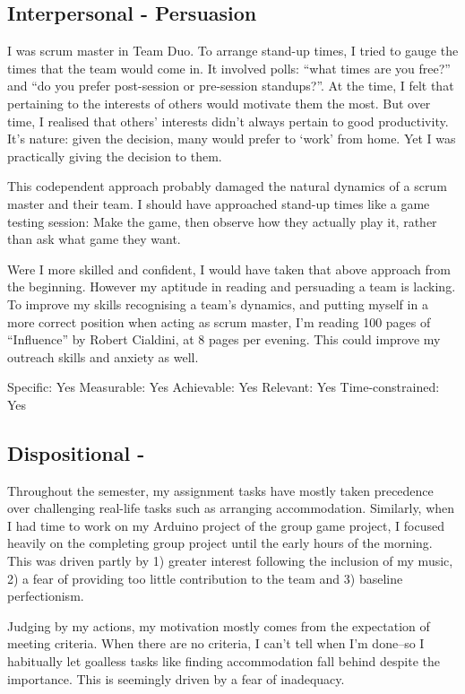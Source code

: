 \documentclass{scrartcl}
\begin{document}
\subsection{Interpersonal - Persuasion} %
I was scrum master in Team Duo. To arrange stand-up times, I tried to gauge the times that the team would come in. It involved polls: ``what times are you free?'' and ``do you prefer post-session or pre-session standups?''. At the time, I felt that pertaining to the interests of others would motivate them the most. But over time, I realised that others' interests didn't always pertain to good productivity. It's nature: given the decision, many would prefer to `work' from home. Yet I was practically giving the decision to them.

This codependent approach probably damaged the natural dynamics of a scrum master and their team. I should have approached stand-up times like a game testing session: Make the game, then observe how they actually play it, rather than ask what game they want.

Were I more skilled and confident, I would have taken that above approach from the beginning. However my aptitude in reading and persuading a team is lacking. To improve my skills recognising a team's dynamics, and putting myself in a more correct position when acting as scrum master, I'm reading 100 pages of ``Influence'' by Robert Cialdini, at 8 pages per evening. This could improve my outreach skills and anxiety as well.

Specific: Yes
Measurable: Yes
Achievable: Yes
Relevant: Yes
Time-constrained: Yes

\subsection{Dispositional - } %
Throughout the semester, my assignment tasks have mostly taken precedence over challenging real-life tasks such as arranging accommodation. Similarly, when I had time to work on my Arduino project of the group game project, I focused heavily on the completing group project until the early hours of the morning. This was driven partly by 1) greater interest following the inclusion of my music, 2) a fear of providing too little contribution to the team and 3) baseline perfectionism.

Judging by my actions, my motivation mostly comes from the expectation of meeting criteria. When there are no criteria, I can't tell when I'm done--so I habitually let goalless tasks like finding accommodation fall behind despite the importance. This is seemingly driven by a fear of inadequacy.
\end{document}
